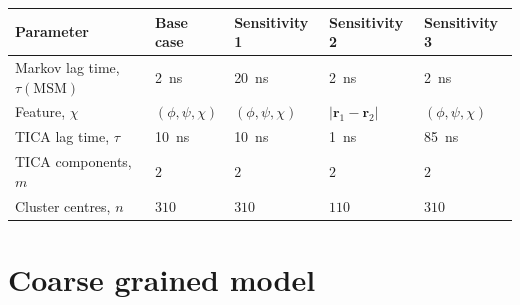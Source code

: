 \begin{table}
    \centering
    \begin{tabular}{|l|l|l|l|l|}
        \hline
        Parameter & Base case & Sensitivity 1 & Sensitivity 2 & Sensitivity 3 \\
        \hline\hline
        Markov lag time, $\tau(\textrm{MSM})$ & \SI{2}{\nano\second} &  \SI{20}{\nano\second}& \SI{2}{\nano\second}& \SI{2}{\nano\second} \\
        Feature, $\chi$ & $(\phi, \psi, \chi)$ & $(\phi, \psi, \chi)$ & $|\mathbf{r}_{1}-\mathbf{r}_2|$ & $(\phi, \psi, \chi)$ \\
        TICA lag time, $\tau$ & \SI{10}{\nano\second} & \SI{10}{\nano\second}&\SI{1}{\nano\second} &\SI{85}{\nano\second} \\
        TICA components, $m$ & $2$ & $2$ & $2$ & $2$ \\
        Cluster centres, $n$ & $310$ & $310$ & $110$ & $310$ \\
        \hline
    \end{tabular}
    \label{tab:aadh_final_msm_specs}
\end{table}

\section{Coarse grained model}\label{sec:aadh_hmm}

